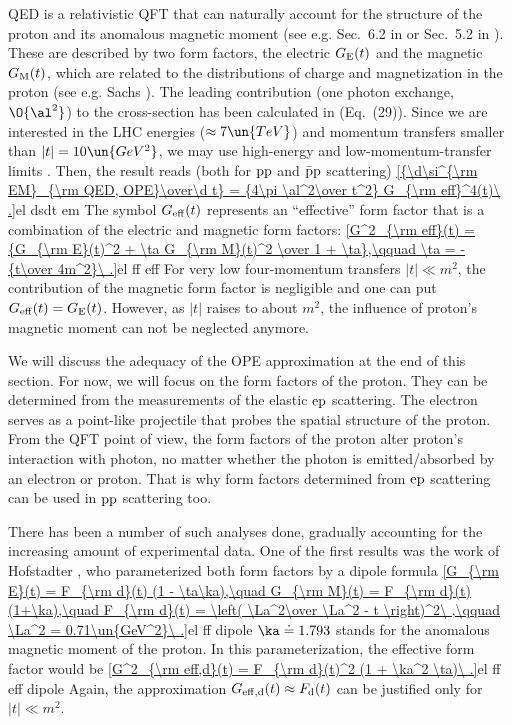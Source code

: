 QED is a relativistic QFT that can naturally account for the structure of the proton and its anomalous magnetic moment (see e.g. Sec.~6.2 in  or Sec.~5.2 in ). These are described by two form factors, the electric $G_{\rm E}(t)$ and the magnetic $G_{\rm M}(t)$, which are related to the distributions of charge and magnetization in the proton (see e.g. Sachs ). The leading contribution (one photon exchange, $\O{\al^2}$) to the cross-section has been calculated in  (Eq.~(29)). Since we are interested in the LHC energies ($\approx 7\un{TeV}$) and momentum transfers smaller than $|t| = 10\un{GeV^2}$, we may use high-energy and low-momentum-transfer limits . Then, the result reads (both for $\rm pp$ and $\rm \bar p p$ scattering)
\eqref{{\d\si^{\rm EM}_{\rm QED, OPE}\over\d t} = {4\pi \al^2\over t^2} G_{\rm eff}^4(t)\ .}{el dsdt em}
The symbol $G_{\rm eff}(t)$ represents an ``effective'' form factor that is a combination of the electric and magnetic form factors:
\eqref{G^2_{\rm eff}(t) = {G_{\rm E}(t)^2 + \ta G_{\rm M}(t)^2 \over 1 + \ta},\qquad \ta = - {t\over 4m^2}\ .}{el ff eff}
For very low four-momentum transfers $|t| \ll m^2$, the contribution of the magnetic form factor is negligible and one can put $G_{\rm eff}(t) = G_{\rm E}(t)$. However, as $|t|$ raises to about $m^2$, the influence of proton's magnetic moment can not be neglected anymore.

We will discuss the adequacy of the OPE approximation at the end of this section. For now, we will focus on the form factors of the proton. They can be determined from the measurements of the elastic $\rm ep$ scattering. The electron serves as a point-like projectile that probes the spatial structure of the proton. From the QFT point of view, the form factors of the proton alter proton's interaction with photon, no matter whether the photon is emitted/absorbed by an electron or proton. That is why form factors determined from $\rm ep$ scattering can be used in $\rm pp$ scattering too.

There has been a number of such analyses done, gradually accounting for the increasing amount of experimental data. One of the first results was the work of Hofstadter , who parameterized both form factors by a dipole formula
\eqref{G_{\rm E}(t) = F_{\rm d}(t) (1 - \ta\ka),\quad G_{\rm M}(t) = F_{\rm d}(t) (1+\ka),\quad F_{\rm d}(t) = \left( \La^2\over \La^2 - t \right)^2\ ,\qquad \La^2 = 0.71\un{GeV^2}\ .}{el ff dipole}
$\ka\doteq 1.793$ stands for the anomalous magnetic moment of the proton. In this parameterization, the effective form factor would be
\eqref{G^2_{\rm eff,d}(t) = F_{\rm d}(t)^2 (1 + \ka^2 \ta)\ .}{el ff eff dipole}
Again, the approximation $G_{\rm eff,d}(t)\approx F_{\rm d}(t)$ can be justified only for $|t| \ll m^2$.

